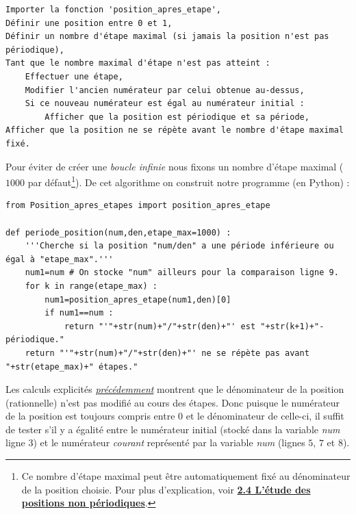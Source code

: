 \documentclass[a4paper,french,12pt]{article}
\begin{document}
\begin{center}
\begin{verbatim}
Importer la fonction 'position_apres_etape',
Définir une position entre 0 et 1,
Définir un nombre d'étape maximal (si jamais la position n'est pas périodique),
Tant que le nombre maximal d'étape n'est pas atteint :
    Effectuer une étape,
    Modifier l'ancien numérateur par celui obtenue au-dessus,
    Si ce nouveau numérateur est égal au numérateur initial :
        Afficher que la position est périodique et sa période,
Afficher que la position ne se répète avant le nombre d'étape maximal fixé.
\end{verbatim}
\end{center}
Pour éviter de créer une \emph{boucle infinie} nous fixons un nombre d'étape maximal ($1000$ par défaut\footnote{Ce nombre d'étape maximal peut être automatiquement fixé au dénominateur de la position choisie. Pour plus d'explication, voir \hyperlink{1}{\textbf{2.4 L'étude des positions non périodiques}}.}). De cet algorithme on construit notre programme (en Python) :

\vspace*{-0.5cm}

\hypertarget{6}{}
\begin{center}
\begin{verbatim}
from Position_apres_etapes import position_apres_etape

def periode_position(num,den,etape_max=1000) :
    '''Cherche si la position "num/den" a une période inférieure ou égal à "etape_max".'''
    num1=num # On stocke "num" ailleurs pour la comparaison ligne 9.
    for k in range(etape_max) :
        num1=position_apres_etape(num1,den)[0]
        if num1==num :
            return "'"+str(num)+"/"+str(den)+"' est "+str(k+1)+"-périodique."
    return "'"+str(num)+"/"+str(den)+"' ne se répète pas avant "+str(etape_max)+" étapes."
\end{verbatim}
\end{center}

Les calculs explicités \hyperlink{3}{\emph{précédemment}} montrent que le dénominateur de la position (rationnelle) n'est pas modifié au cours des étapes. Donc puisque le numérateur de la position est toujours compris entre $0$ et le dénominateur de celle-ci, il suffit de tester s'il y a égalité entre le numérateur initial (stocké dans la variable \emph{num} ligne $3$) et le numérateur \emph{courant} représenté par la variable \emph{num} (lignes $5$, $7$ et $8$). 
\end{document}

